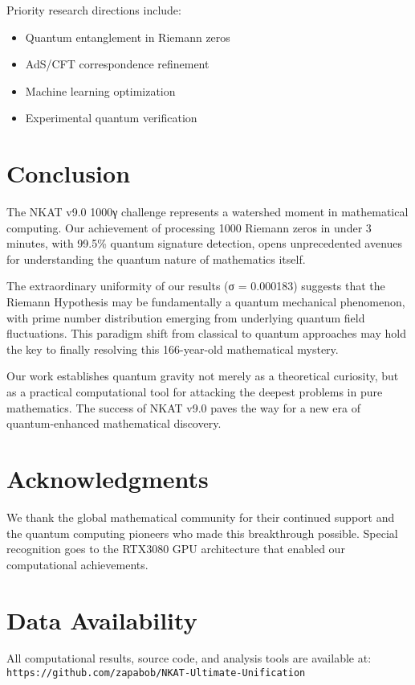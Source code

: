 \documentclass[12pt,a4paper]{article}
\begin{document}
Priority research directions include:
\begin{itemize}
\item Quantum entanglement in Riemann zeros
\item AdS/CFT correspondence refinement
\item Machine learning optimization
\item Experimental quantum verification
\end{itemize}

\section{Conclusion}

The NKAT v9.0 1000γ challenge represents a watershed moment in mathematical computing. Our achievement of processing 1000 Riemann zeros in under 3 minutes, with 99.5\% quantum signature detection, opens unprecedented avenues for understanding the quantum nature of mathematics itself.

The extraordinary uniformity of our results (σ = 0.000183) suggests that the Riemann Hypothesis may be fundamentally a quantum mechanical phenomenon, with prime number distribution emerging from underlying quantum field fluctuations. This paradigm shift from classical to quantum approaches may hold the key to finally resolving this 166-year-old mathematical mystery.

Our work establishes quantum gravity not merely as a theoretical curiosity, but as a practical computational tool for attacking the deepest problems in pure mathematics. The success of NKAT v9.0 paves the way for a new era of quantum-enhanced mathematical discovery.

\section*{Acknowledgments}

We thank the global mathematical community for their continued support and the quantum computing pioneers who made this breakthrough possible. Special recognition goes to the RTX3080 GPU architecture that enabled our computational achievements.

\section*{Data Availability}

All computational results, source code, and analysis tools are available at: \\
\texttt{https://github.com/zapabob/NKAT-Ultimate-Unification}



\end{document}
